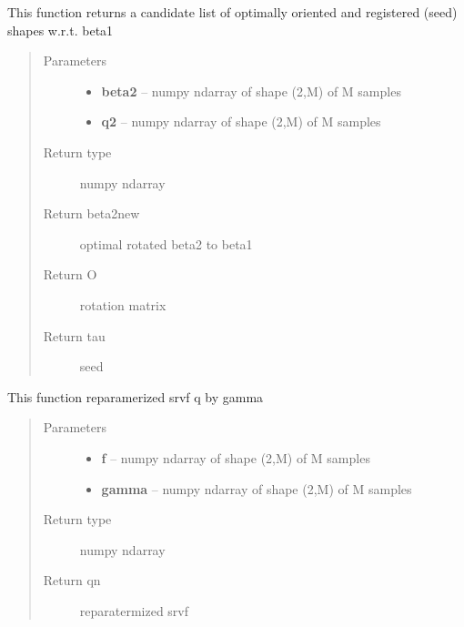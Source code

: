 \documentclass[letterpaper,10pt,english]{sphinxmanual}
\begin{document}
\begin{fulllineitems}
\label{curve_functions:curve_functions.find_rotation_and_seed_coord}
This function returns a candidate list of optimally oriented and
registered (seed) shapes w.r.t. beta1
\begin{quote}\begin{description}
\item[{Parameters}] \leavevmode\begin{itemize}
\item {} 
\textbf{beta2} -- numpy ndarray of shape (2,M) of M samples

\item {} 
\textbf{q2} -- numpy ndarray of shape (2,M) of M samples

\end{itemize}

\item[{Return type}] \leavevmode
numpy ndarray

\item[{Return beta2new}] \leavevmode
optimal rotated beta2 to beta1

\item[{Return O}] \leavevmode
rotation matrix

\item[{Return tau}] \leavevmode
seed

\end{description}\end{quote}

\end{fulllineitems}


\begin{fulllineitems}
\label{curve_functions:curve_functions.group_action_by_gamma}
This function reparamerized srvf q by gamma
\begin{quote}\begin{description}
\item[{Parameters}] \leavevmode\begin{itemize}
\item {} 
\textbf{f} -- numpy ndarray of shape (2,M) of M samples

\item {} 
\textbf{gamma} -- numpy ndarray of shape (2,M) of M samples

\end{itemize}

\item[{Return type}] \leavevmode
numpy ndarray

\item[{Return qn}] \leavevmode
reparatermized srvf

\end{description}\end{quote}

\end{fulllineitems}
\end{document}
